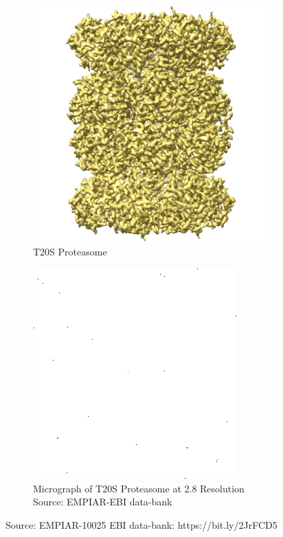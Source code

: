 \documentclass{report}
\begin{document}
\begin{figure}[h]
\centering
\begin{subfigure}{.5\textwidth}
\centering
\includegraphics[width=0.5\linewidth]{EMPIAR-10025}
\captionsetup{justification=centering}
\caption{T20S Proteasome}
\end{subfigure} %

\begin{subfigure}{.75\textwidth}
\centering
\includegraphics[width=0.75\linewidth]{micrograph}
\captionsetup{justification=centering}
\caption{ Micrograph of T20S Proteasome at 2.8 \text{\AA} Resolution Source: EMPIAR-EBI data-bank}
\end{subfigure}
\caption{ Source: EMPIAR-10025 EBI data-bank: https://bit.ly/2JrFCD5}
\label{fig:micrograph}
\end{figure}
\end{document}
